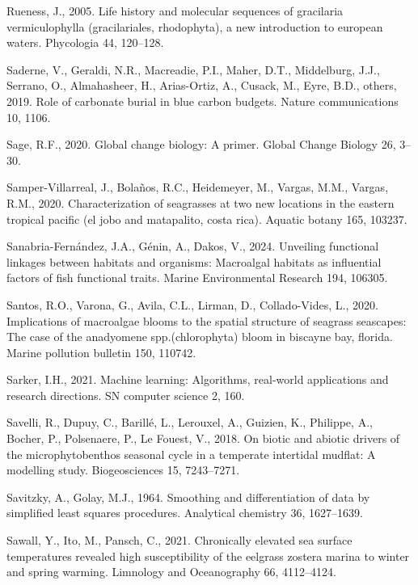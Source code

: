 \documentclass[
  letterpaper,
  11pt,
  english,
  singlespacing,
  headsepline]{MastersDoctoralThesis}
\newlength{\cslhangindent}
\newenvironment{CSLReferences}[2] %
 {\begin{list}{}{%
  \setlength{\itemindent}{0pt}
  \setlength{\leftmargin}{0pt}
  \setlength{\parsep}{0pt}
  \ifodd #1
   \setlength{\leftmargin}{\cslhangindent}
   \setlength{\itemindent}{-1\cslhangindent}
  \fi
  \setlength{\itemsep}{#2\baselineskip}}}
 {\end{list}}
\begin{document}
\begin{CSLReferences}{1}{0}
Rueness, J., 2005. Life history and molecular sequences of gracilaria
vermiculophylla (gracilariales, rhodophyta), a new introduction to
european waters. Phycologia 44, 120--128.

Saderne, V., Geraldi, N.R., Macreadie, P.I., Maher, D.T., Middelburg,
J.J., Serrano, O., Almahasheer, H., Arias-Ortiz, A., Cusack, M., Eyre,
B.D., others, 2019. Role of carbonate burial in blue carbon budgets.
Nature communications 10, 1106.

Sage, R.F., 2020. Global change biology: A primer. Global Change Biology
26, 3--30.

Samper-Villarreal, J., Bolaños, R.C., Heidemeyer, M., Vargas, M.M.,
Vargas, R.M., 2020. Characterization of seagrasses at two new locations
in the eastern tropical pacific (el jobo and matapalito, costa rica).
Aquatic botany 165, 103237.

Sanabria-Fernández, J.A., Génin, A., Dakos, V., 2024. Unveiling
functional linkages between habitats and organisms: Macroalgal habitats
as influential factors of fish functional traits. Marine Environmental
Research 194, 106305.

Santos, R.O., Varona, G., Avila, C.L., Lirman, D., Collado-Vides, L.,
2020. Implications of macroalgae blooms to the spatial structure of
seagrass seascapes: The case of the anadyomene spp.(chlorophyta) bloom
in biscayne bay, florida. Marine pollution bulletin 150, 110742.

Sarker, I.H., 2021. Machine learning: Algorithms, real-world
applications and research directions. SN computer science 2, 160.

Savelli, R., Dupuy, C., Barillé, L., Lerouxel, A., Guizien, K.,
Philippe, A., Bocher, P., Polsenaere, P., Le Fouest, V., 2018. On biotic
and abiotic drivers of the microphytobenthos seasonal cycle in a
temperate intertidal mudflat: A modelling study. Biogeosciences 15,
7243--7271.

Savitzky, A., Golay, M.J., 1964. Smoothing and differentiation of data
by simplified least squares procedures. Analytical chemistry 36,
1627--1639.

Sawall, Y., Ito, M., Pansch, C., 2021. Chronically elevated sea surface
temperatures revealed high susceptibility of the eelgrass zostera marina
to winter and spring warming. Limnology and Oceanography 66, 4112--4124.


\end{CSLReferences}
\end{document}
